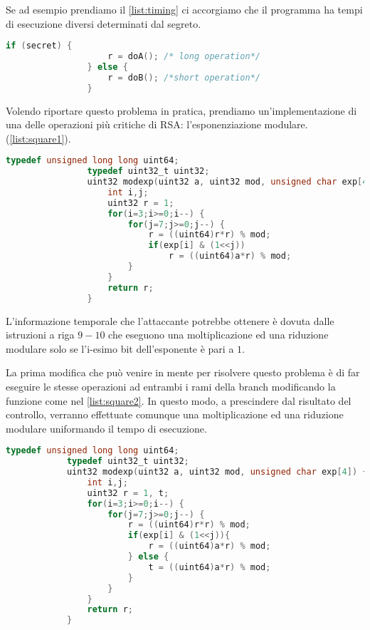 		Se ad esempio prendiamo il \cref{list:timing} ci accorgiamo che il programma ha tempi di esecuzione diversi determinati dal segreto.
		
		\begin{center}
			\begin{lstlisting}[language={C},caption={Codice da proteggere},label={list:timing}]
				if (secret) {
					r = doA(); /* long operation*/
				} else {
					r = doB(); /*short operation*/
				}
			\end{lstlisting}
		\end{center}
		
		Volendo riportare questo problema in pratica, prendiamo un'implementazione di una delle operazioni più critiche di RSA: l'esponenziazione modulare. (\cref{list:square1}).
		
		\begin{center}
			\begin{lstlisting}[language={C},caption={RSA, esponenziazione modulare v1},label={list:square1}]
				typedef unsigned long long uint64;
				typedef uint32_t uint32;
				uint32 modexp(uint32 a, uint32 mod, unsigned char exp[4]) {
					int i,j;
					uint32 r = 1;
					for(i=3;i>=0;i--) {
						for(j=7;j>=0;j--) {
							r = ((uint64)r*r) % mod;
							if(exp[i] & (1<<j))
								r = ((uint64)a*r) % mod;
						}
					}
					return r;
				}
			\end{lstlisting}
		\end{center}
		
		L'informazione temporale che l'attaccante potrebbe ottenere è dovuta dalle istruzioni a riga $9-10$ che eseguono una moltiplicazione ed una riduzione modulare solo se l'i-esimo bit dell'esponente è pari a $1$.
		
		La prima modifica che può venire in mente per risolvere questo problema è di far eseguire le stesse operazioni ad entrambi i rami della branch modificando la funzione come nel \cref{list:square2}. In questo modo, a prescindere dal risultato del controllo, verranno effettuate comunque una moltiplicazione ed una riduzione modulare uniformando il tempo di esecuzione.
		
		\begin{center}
			\begin{lstlisting}[language={C},caption={RSA, esponenziazione modulare v2},label={list:square2}]
			typedef unsigned long long uint64;
			typedef uint32_t uint32;
			uint32 modexp(uint32 a, uint32 mod, unsigned char exp[4]) {
				int i,j;
				uint32 r = 1, t;
				for(i=3;i>=0;i--) {
					for(j=7;j>=0;j--) {
						r = ((uint64)r*r) % mod;
						if(exp[i] & (1<<j)){
							r = ((uint64)a*r) % mod;
						} else {
							t = ((uint64)a*r) % mod;
						}
					}
				}
				return r;
			}
			\end{lstlisting}
		\end{center}
	
